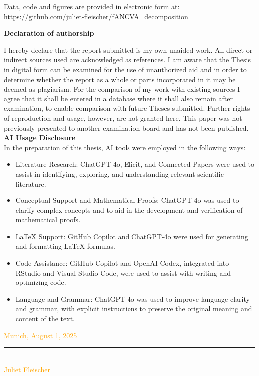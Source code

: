 \documentclass[12pt]{article}
\begin{document}
Data, code and figures are provided in electronic form at:\\
\url{https://github.com/juliet-fleischer/fANOVA_decomposition}


\newpage
    



\Large
\noindent
\textbf{Declaration of authorship} 
\vspace{0.5cm}
\noindent
\normalsize

I hereby declare that the report submitted is my own unaided work. All direct 
or indirect sources used are acknowledged as references. I am aware that the 
Thesis in digital form can be examined for the use of unauthorized aid and in 
order to determine whether the report as a whole or parts incorporated in it may 
be deemed as plagiarism. For the comparison of my work with existing sources I 
agree that it shall be entered in a database where it shall also remain after 
examination, to enable comparison with future Theses submitted. Further rights 
of reproduction and usage, however, are not granted here. This paper was not 
previously presented to another examination board and has not been published.
\\
\textbf{AI Usage Disclosure}\\
In the preparation of this thesis, AI tools were employed in the following ways:
\begin{itemize}
    \item Literature Research: ChatGPT-4o, Elicit, and Connected Papers were used to assist in identifying, exploring, and understanding relevant scientific literature.
    \item Conceptual Support and Mathematical Proofs: ChatGPT-4o was used to clarify complex concepts and to aid in the development and verification of mathematical proofs.
    \item \LaTeX{} Support: GitHub Copilot and ChatGPT-4o were used for generating and formatting \LaTeX{} formulas.
    \item Code Assistance: GitHub Copilot and OpenAI Codex, integrated into RStudio and Visual Studio Code, were used to assist with writing and optimizing code.
    \item Language and Grammar: ChatGPT-4o was used to improve language clarity and grammar, with explicit instructions to preserve the original meaning and content of the text.
\end{itemize}


\vspace{1cm}
\textcolor{orange}{Munich, August 1, 2025} \\

\vspace{3cm}

\noindent\rule{0.5\textwidth}{0.4pt} \\

\textcolor{orange}{Juliet Fleischer}

\end{document}
